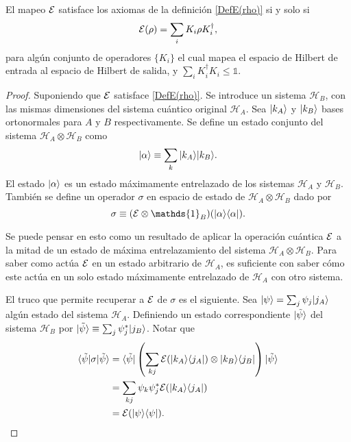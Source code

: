 \begin{theorem}
    El mapeo $\mathcal{E}$ satisface los axiomas de la definición {\ref{DefE(rho)}} si y solo si 
    \begin{equation}
        \mathcal{E}(\rho)=\sum_i K_i \rho K_i^\dagger,
    \end{equation}
    para algún conjunto de operadores $\{K_i\}$ el cual mapea el espacio de Hilbert de entrada al espacio de Hilbert de salida, y $\sum_i K_i^\dagger K_i\le \mathds{1}$.
\end{theorem}


\begin{proof}
Suponiendo que $\mathcal{E}$ satisface {\ref{DefE(rho)}}. Se introduce un sistema
$\mathcal{H}_B$, con las mismas dimensiones del sistema cuántico original
$\mathcal{H}_A$. Sea $|k_A\rangle$ y $|k_B\rangle$  bases ortonormales para $A$ y $B$
respectivamente. Se define un estado conjunto del sistema $\mathcal{H}_A\otimes
\mathcal{H}_B$ como \[|\alpha\rangle \equiv \sum_k |k_A\rangle |k_B\rangle.\] El estado
$|\alpha\rangle $ es un estado máximamente entrelazado de los sistemas
$\mathcal{H}_A$ y $\mathcal{H}_B$. También se define un operador $\sigma$ en
espacio de estado de $\mathcal{H}_A\otimes \mathcal{H}_B$ dado por 
\begin{equation}\label{sigma1}
    \sigma \equiv (\E\otimes\mathds{1}_B)(|\alpha\rala \alpha|).
\end{equation}


Se puede pensar en esto como un resultado de aplicar la operación cuántica $\mathcal{E}$
a la mitad de un estado de máxima entrelazamiento del sistema
$\mathcal{H}_A\otimes \mathcal{H}_B$. Para saber como actúa $\mathcal{E}$ en un estado
arbitrario de $\mathcal{H}_A$, es suficiente con saber cómo este actúa en un
solo estado máximamente entrelazado de $\mathcal{H}_A$ con otro sistema.


El truco que permite recuperar a $\mathcal{E}$ de $\sigma$ es el siguiente. Sea $|\psi\rangle=\sum_j \psi_j |j_A\rangle$ algún estado del sistema $\mathcal{H}_A$. Definiendo un estado correspondiente $|\tilde{\psi}\rangle$ del sistema $\mathcal{H}_B$ por $|\tilde{\psi}\rangle \equiv \sum_j \psi_j^*|j_B\rangle$. Notar que
\begin{equation}
    \begin{split}
        \langle \tilde \psi |\sigma |\tilde{\psi}\rangle&= \langle \tilde \psi |\left(\sum_{kj} \mathcal{E} (|k_A \rangle \langle j_A|)\otimes |k_B\rangle \langle j_B|\right) |\tilde{\psi}\rangle\\
        &=\sum_{kj} \psi_k \psi_j^* \mathcal{E} (|k_A \rangle \langle j_A|)\\
        &=\mathcal{E}(|\psi\rangle \langle\psi|).
    \end{split}
\end{equation}



\end{proof}
